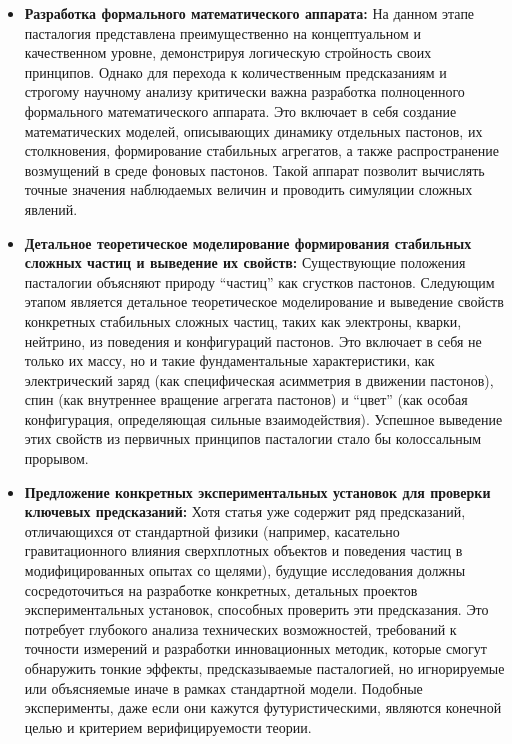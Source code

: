 \documentclass[pdflatex,sn-mathphys-num,referee]{sn-jnl}
\begin{document}
\begin{itemize}
    \item \textbf{Разработка формального математического аппарата:} На данном этапе пасталогия представлена преимущественно на концептуальном и качественном уровне, демонстрируя логическую стройность своих принципов. Однако для перехода к количественным предсказаниям и строгому научному анализу критически важна разработка полноценного формального математического аппарата. Это включает в себя создание математических моделей, описывающих динамику отдельных пастонов, их столкновения, формирование стабильных агрегатов, а также распространение возмущений в среде фоновых пастонов. Такой аппарат позволит вычислять точные значения наблюдаемых величин и проводить симуляции сложных явлений.
    
    \item \textbf{Детальное теоретическое моделирование формирования стабильных сложных частиц и выведение их свойств:} Существующие положения пасталогии объясняют природу ``частиц'' как сгустков пастонов. Следующим этапом является детальное теоретическое моделирование и выведение свойств конкретных стабильных сложных частиц, таких как электроны, кварки, нейтрино, из поведения и конфигураций пастонов. Это включает в себя не только их массу, но и такие фундаментальные характеристики, как электрический заряд (как специфическая асимметрия в движении пастонов), спин (как внутреннее вращение агрегата пастонов) и ``цвет'' (как особая конфигурация, определяющая сильные взаимодействия). Успешное выведение этих свойств из первичных принципов пасталогии стало бы колоссальным прорывом.
    
    \item \textbf{Предложение конкретных экспериментальных установок для проверки ключевых предсказаний:} Хотя статья уже содержит ряд предсказаний, отличающихся от стандартной физики (например, касательно гравитационного влияния сверхплотных объектов и поведения частиц в модифицированных опытах со щелями), будущие исследования должны сосредоточиться на разработке конкретных, детальных проектов экспериментальных установок, способных проверить эти предсказания. Это потребует глубокого анализа технических возможностей, требований к точности измерений и разработки инновационных методик, которые смогут обнаружить тонкие эффекты, предсказываемые пасталогией, но игнорируемые или объясняемые иначе в рамках стандартной модели. Подобные эксперименты, даже если они кажутся футуристическими, являются конечной целью и критерием верифицируемости теории.
\end{itemize}
\end{document}
